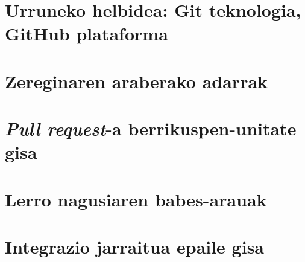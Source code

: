 \section{Urruneko helbidea: Git teknologia, GitHub plataforma}

\section{Zereginaren araberako adarrak}

\section{\textit{Pull request}-a berrikuspen-unitate gisa}

\section{Lerro nagusiaren babes-arauak}

\section{Integrazio jarraitua epaile gisa}

